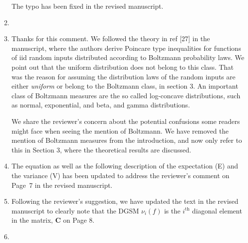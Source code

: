 \documentclass[11pt,final]{article}
\newcommand{\referee}[1]{\vspace{.1ex}\noindent{\textcolor{blue}{#1}}}
\begin{document}
\begin{enumerate}[wide, labelwidth=!, labelindent=0pt]
\noindent  The typo has been fixed in the revised manuscript. 

\item \referee{7.23-27: why 'statistical independence' and not just 'independence'? Is there any other 
type of independence?}

\item \referee{7.29-30: Any PDF can be written in a Boltzmann form, V(x) is just the negative log-PDF, 
I am not sure if it is necessary to bring up a Boltzmann distribution language here.
Also, it could be confused with Maxwell-Boltzmann distribution, which is a very specific PDF form.}
Thanks for this comment. We followed the theory in ref [27] in the manuscript, 
where the authors derive Poincare type inequalities for functions of 
iid random inputs distributed according to Boltzmann probability laws. We point
out that the uniform distribution does not belong to this class. That was the reason 
for assuming the distribution laws of the
random inputs are either \emph{uniform} or belong to 
the Boltzmann class, in section 3. An important class of Boltzmann measures are 
the so called log-concave distributions, such as normal, exponential, and beta, and gamma
distributions. 

We share the reviewer's concern about the potential confusions some readers might face when 
seeing the mention of Boltzmann. We have removed the mention of Boltzmann measures
from the introduction, and now only refer to this in Section 3, where the theoretical
results are discussed. 
 

\item \referee{7.40: Explain what E and V are with respect to in Eq (8).}

\noindent  The equation as well as the following description of the expectation (E) and the variance (V)
has been updated to address the reviewer's comment on Page~7 in the revised manuscript. 

\item \referee{7.50: Just say in words that it is the i-th diagonal element of matrix C.}

\noindent Following the reviewer's suggestion, we have updated the text in the revised manuscript to
clearly note that the DGSM $\nu_i(f)$ is the $i^{\text{th}}$ diagonal element in the matrix, $\mathbf{C}$
on Page 8.

\item \referee{10.56: what if there is no eigenvalue gap of O(100)?}


\end{enumerate}
\end{document}
